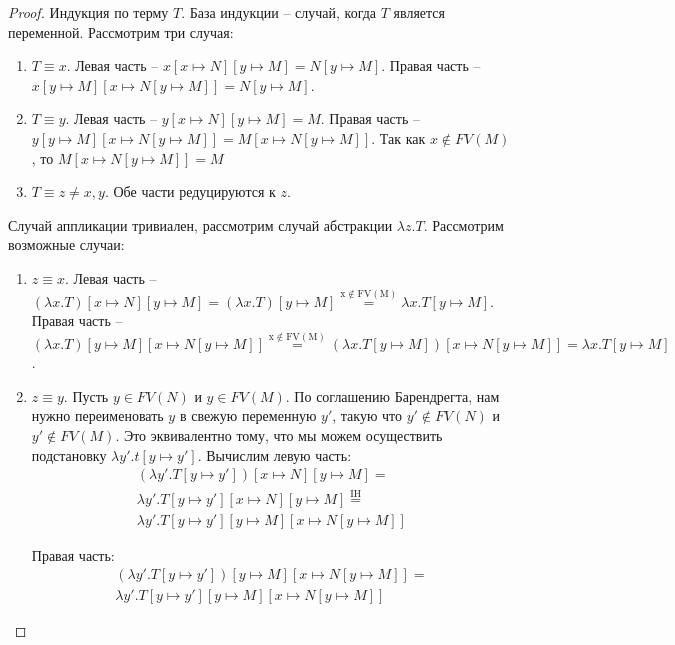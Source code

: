 \begin{proof}
  Индукция по терму $T$. База индукции -- случай, когда $T$ является переменной. Рассмотрим три случая:
  \begin{enumerate}
    \item $T \equiv x$. Левая часть -- $x[x \mapsto N][y \mapsto M] = N[y \mapsto M]$. Правая часть -- $x[y\mapsto M][x \mapsto N[y \mapsto M]] = N[y \mapsto M]$.
    \item $T \equiv y$. Левая часть -- $y[x \mapsto N][y \mapsto M] = M$. Правая часть -- $y[y\mapsto M][x \mapsto N[y \mapsto M]] = M[x\mapsto N[y \mapsto M]]$. Так как $x \notin FV(M)$, то $M[x\mapsto N[y \mapsto M]] = M$
    \item $T \equiv z \neq x,y$. Обе части редуцируются к $z$.
  \end{enumerate}

  Случай аппликации тривиален, рассмотрим случай абстракции $\lambda z.T$. Рассмотрим возможные случаи:

  \begin{enumerate}
    \item $z \equiv x$. Левая часть -- $(\lambda x.T)[x \mapsto N][y \mapsto M] = (\lambda x.T)[y \mapsto M] \overset{\mathrm{x \notin FV(M)}}{=} \lambda x.T[y \mapsto M]$. Правая часть -- $(\lambda x.T)[y \mapsto M][x \mapsto N[y \mapsto M]] \overset{\mathrm{x \notin FV(M)}}{=} (\lambda x.T[y \mapsto M])[x \mapsto N[y \mapsto M]] = \lambda x.T[y \mapsto M]$.

    \item $z \equiv y$. Пусть $y \in FV(N)$ и $y \in FV(M)$. По соглашению Барендрегта, нам нужно переименовать $y$ в свежую переменную $y'$, такую что $y' \notin FV(N)$ и $y' \notin FV(M)$. Это эквивалентно тому, что мы можем осуществить подстановку $\lambda y'.t[y \mapsto y']$. Вычислим левую часть:
    \begin{gather*}
      (\lambda y'.T[y \mapsto y'])[x \mapsto N][y \mapsto M] = \\
       \lambda y'.T[y \mapsto y'][x \mapsto N][y \mapsto M] \overset{\mathrm{IH}}{=} \\
       \lambda y'.T[y \mapsto y'][y \mapsto M][x \mapsto N[y \mapsto M]]
    \end{gather*}

    Правая часть:
    \begin{gather*}
      (\lambda y'.T[y \mapsto y'])[y \mapsto M][x \mapsto N[y \mapsto M]] = \\
      \lambda y'.T[y \mapsto y'][y \mapsto M][x \mapsto N[y \mapsto M]]
    \end{gather*}


\end{enumerate}
\end{proof}
